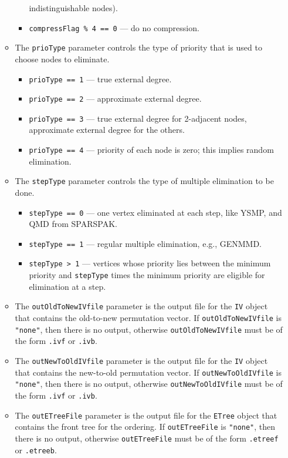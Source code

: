 \begin{enumerate}
\begin{itemize}
\begin{itemize}
indistinguishable nodes).
\item 
{\tt compressFlag \% 4 == 0} --- do no compression.
\end{itemize}
\item
The {\tt prioType} parameter controls the type of priority that is
used to choose nodes to eliminate.
\begin{itemize}
\item 
{\tt prioType == 1} --- true external degree.
\item 
{\tt prioType == 2} --- approximate external degree.
\item 
{\tt prioType == 3} --- true external degree for 2-adjacent nodes,
approximate external degree for the others.
\item 
{\tt prioType == 4} --- priority of each node is zero; this
implies random elimination.
\end{itemize}
\item
The {\tt stepType} parameter controls the type of multiple
elimination to be done.
\begin{itemize}
\item 
{\tt stepType == 0} --- one vertex eliminated at each step,
like YSMP, and QMD from SPARSPAK.
\item 
{\tt stepType == 1} --- regular multiple elimination, e.g., GENMMD.
\item 
{\tt stepType > 1} --- vertices whose priority lies between
the minimum priority and {\tt stepType} times the minimum priority
are eligible for elimination at a step.
\end{itemize}
\item
The {\tt outOldToNewIVfile} parameter is the output file for the 
{\tt IV} object that contains the old-to-new permutation vector.
If {\tt outOldToNewIVfile} is {\tt "none"}, then there is no output,
otherwise {\tt outOldToNewIVfile} 
must be of the form {\tt *.ivf} or {\tt *.ivb}.
\item
The {\tt outNewToOldIVfile} parameter is the output file for the 
{\tt IV} object that contains the new-to-old permutation vector.
If {\tt outNewToOldIVfile} is {\tt "none"}, then there is no output,
otherwise {\tt outNewToOldIVfile} 
must be of the form {\tt *.ivf} or {\tt *.ivb}.
\item
The {\tt outETreeFile} parameter is the output file for the 
{\tt ETree} object that contains the front tree for the ordering.
If {\tt outETreeFile} is {\tt "none"}, then there is no output,
otherwise {\tt outETreeFile} 
must be of the form {\tt *.etreef} or {\tt *.etreeb}.

\end{itemize}
\end{enumerate}
